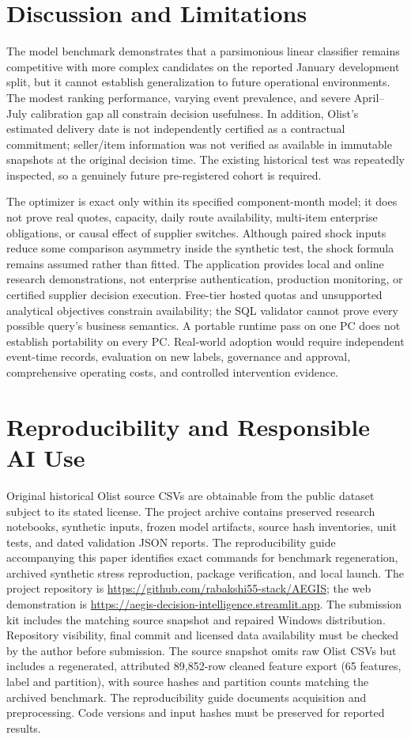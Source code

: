 \documentclass[conference,a4paper]{IEEEtran}
\begin{document}
\section{Discussion and Limitations}
The model benchmark demonstrates that a parsimonious linear classifier remains competitive with more complex candidates on the reported January development split, but it cannot establish generalization to future operational environments. The modest ranking performance, varying event prevalence, and severe April--July calibration gap all constrain decision usefulness. In addition, Olist's estimated delivery date is not independently certified as a contractual commitment; seller/item information was not verified as available in immutable snapshots at the original decision time. The existing historical test was repeatedly inspected, so a genuinely future pre-registered cohort is required.

The optimizer is exact only within its specified component-month model; it does not prove real quotes, capacity, daily route availability, multi-item enterprise obligations, or causal effect of supplier switches. Although paired shock inputs reduce some comparison asymmetry inside the synthetic test, the shock formula remains assumed rather than fitted. The application provides local and online research demonstrations, not enterprise authentication, production monitoring, or certified supplier decision execution. Free-tier hosted quotas and unsupported analytical objectives constrain availability; the SQL validator cannot prove every possible query's business semantics. A portable runtime pass on one PC does not establish portability on every PC. Real-world adoption would require independent event-time records, evaluation on new labels, governance and approval, comprehensive operating costs, and controlled intervention evidence.

\section{Reproducibility and Responsible AI Use}
Original historical Olist source CSVs are obtainable from the public dataset \cite{olist2018} subject to its stated license. The project archive contains preserved research notebooks, synthetic inputs, frozen model artifacts, source hash inventories, unit tests, and dated validation JSON reports. The reproducibility guide accompanying this paper identifies exact commands for benchmark regeneration, archived synthetic stress reproduction, package verification, and local launch. The project repository is \url{https://github.com/rabakshi55-stack/AEGIS}; the web demonstration is \url{https://aegis-decision-intelligence.streamlit.app}. The submission kit includes the matching source snapshot and repaired Windows distribution. Repository visibility, final commit and licensed data availability must be checked by the author before submission. The source snapshot omits raw Olist CSVs but includes a regenerated, attributed 89,852-row cleaned feature export (65 features, label and partition), with source hashes and partition counts matching the archived benchmark. The reproducibility guide documents acquisition and preprocessing. Code versions and input hashes must be preserved for reported results.
\end{document}
